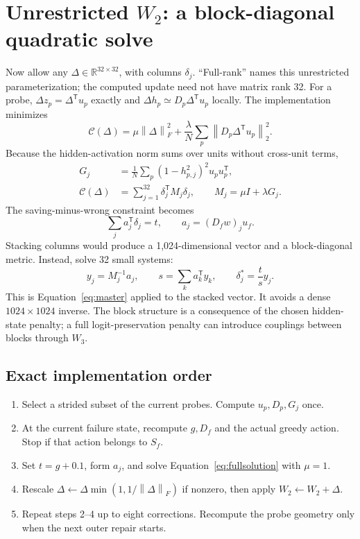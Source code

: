\documentclass[11pt]{article}
\newcommand{\R}{\mathbb{R}}
\newcommand{\norm}[1]{\left\lVert#1\right\rVert}
\begin{document}
\section{Unrestricted \texorpdfstring{$W_2$}{W2}: a block-diagonal quadratic solve}
Now allow any $\Delta\in\R^{32\times32}$, with columns $\delta_j$.
``Full-rank'' names this unrestricted parameterization; the computed update
need not have matrix rank 32.
For a probe, $\Delta z_p=\Delta^{\mathsf T}u_p$ exactly and
$\Delta h_p\simeq D_p\Delta^{\mathsf T}u_p$ locally.
The implementation minimizes
\begin{equation}
 \mathcal{C}(\Delta)=\mu\norm{\Delta}_F^2+
 \frac{\lambda}{N}\sum_p\norm{D_p\Delta^{\mathsf T}u_p}_2^2.
 \label{eq:fullobjective}
\end{equation}
Because the hidden-activation norm sums over units without cross-unit terms,
\begin{align}
 G_j&=\frac1N\sum_p (1-h_{p,j}^2)^2u_pu_p^{\mathsf T},\nonumber\\
 \mathcal{C}(\Delta)&=\sum_{j=1}^{32}\delta_j^{\mathsf T}M_j\delta_j,
 \qquad M_j=\mu I+\lambda G_j.
\end{align}
The saving-minus-wrong constraint becomes
\begin{equation}
 \sum_j a_j^{\mathsf T}\delta_j=t,
 \qquad a_j=(D_fw)_j u_f.
 \label{eq:fullconstraint}
\end{equation}
Stacking columns would produce a 1,024-dimensional vector and a block-diagonal
metric. Instead, solve 32 small systems:
\begin{equation}
 y_j=M_j^{-1}a_j,
 \qquad s=\sum_k a_k^{\mathsf T}y_k,
 \qquad \boxed{\delta_j^*=\frac{t}{s}y_j}.
 \label{eq:fullsolution}
\end{equation}
This is Equation~\eqref{eq:master} applied to the stacked vector. It avoids
a dense $1024\times1024$ inverse. The block structure is a consequence of the
chosen hidden-state penalty; a full logit-preservation penalty can introduce
couplings between blocks through $W_3$.

\subsection*{Exact implementation order}
\begin{enumerate}
\item Select a strided subset of the current probes. Compute $u_p,D_p,G_j$ once.
\item At the current failure state, recompute $g,D_f$ and the actual greedy action.
      Stop if that action belongs to $S_f$.
\item Set $t=g+0.1$, form $a_j$, and solve Equation~\eqref{eq:fullsolution}
      with $\mu=1$.
\item Rescale $\Delta\leftarrow\Delta\min(1,1/\norm{\Delta}_F)$ if nonzero,
      then apply $W_2\leftarrow W_2+\Delta$.
\item Repeat steps 2--4 up to eight corrections. Recompute the probe geometry
      only when the next outer repair starts.
\end{enumerate}
\end{document}
